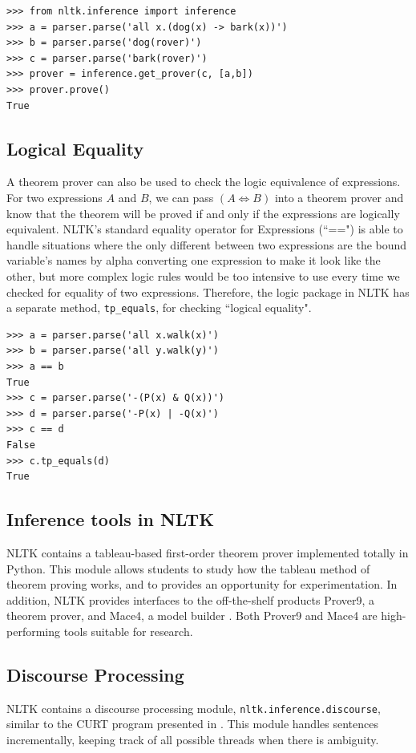 \documentclass[11pt]{article}
\newcommand{\dhgcode}[1]{{\tt #1}}
\begin{document}
\begin{verbatim}
>>> from nltk.inference import inference
>>> a = parser.parse('all x.(dog(x) -> bark(x))')
>>> b = parser.parse('dog(rover)')
>>> c = parser.parse('bark(rover)')
>>> prover = inference.get_prover(c, [a,b])
>>> prover.prove()
True
\end{verbatim}

\subsection{Logical Equality}
A theorem prover can also be used to check the logic equivalence of expressions.  For two expressions $A$ and $B$, we can pass $(A\iff B)$ into a theorem prover and know that the theorem will be proved if and only if the expressions are logically equivalent.  NLTK's standard equality operator for Expressions (``==") is able to handle situations where the only different between two expressions are the bound variable's names by alpha converting one expression to make it look like the other, but more complex logic rules would be too intensive to use every time we checked for equality of two expressions.  Therefore, the logic package in NLTK has a separate method, \dhgcode{tp\_equals}, for checking ``logical equality".

\begin{verbatim}
>>> a = parser.parse('all x.walk(x)')
>>> b = parser.parse('all y.walk(y)')
>>> a == b
True
>>> c = parser.parse('-(P(x) & Q(x))')
>>> d = parser.parse('-P(x) | -Q(x)')
>>> c == d
False
>>> c.tp_equals(d)
True
\end{verbatim}

\subsection{Inference tools in NLTK}
NLTK contains a tableau-based first-order theorem prover implemented totally in Python.  This module allows students to study how the tableau method of theorem proving works, and to provides an opportunity for experimentation.  In addition, NLTK provides interfaces to the off-the-shelf products Prover9, a theorem prover, and Mace4, a model builder \cite{McCune}.  Both Prover9 and Mace4 are high-performing tools suitable for research.

\subsection{Discourse Processing}
NLTK contains a discourse processing module, \dhgcode{nltk.inference.discourse}, similar to the CURT program presented in \cite{BB}.  This module handles sentences incrementally, keeping track of all possible threads when there is ambiguity.  
\end{document}
